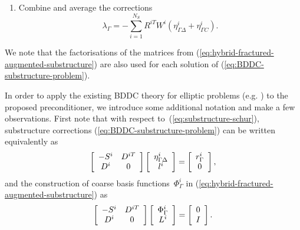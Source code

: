 \begin{algorithm}
\begin{enumerate}
\item Combine and average the corrections%
\begin{equation}
\lambda_{\Gamma}=-\sum_{i=1}^{N_{S}}R^{iT}W^{i}\left(  \eta_{\Gamma \Delta}^{i}%
+\eta_{\Gamma C}^{i}\right)  .\label{eq:BDDC-preconditioner}%
\end{equation}

\end{enumerate}
\end{algorithm}

We note that the factorisations of the matrices from
(\ref{eq:hybrid-fractured-augmented-substructure}) are also used for each
solution of (\ref{eq:BDDC-substructure-problem}).


In order to apply the existing BDDC theory for elliptic problems (e.g. \cite{Mandel-2007-BFM,Mandel-2005-ATP})
to the proposed preconditioner, 
we introduce some additional notation and make a few observations.
First note that with respect to~(\ref{eq:substructure-schur}), substructure corrections (\ref{eq:BDDC-substructure-problem})
can be written equivalently as
\begin{equation}
\left[
\begin{array}
[c]{cc}%
-S^{i} & D^{iT}\\
D^{i} & 0
\end{array}
\right]  \left[
\begin{array}
[c]{c}%
\eta_{\Gamma \Delta}^{i}\\
l^{i}%
\end{array}
\right]  =\left[
\begin{array}
[c]{c}%
r_{\Gamma}^{i}\\
0
\end{array}
\right],
\label{eq:BDDC-substructure-problem-with-Schur}%
\end{equation}
and the construction of coarse basis functions~$\Phi_{\Gamma}^{i}$ in
(\ref{eq:hybrid-fractured-augmented-substructure}) as
\begin{equation}
\left[
\begin{array}
[c]{cc}%
-S^{i} & D^{iT}\\
D^{i} & 0
\end{array}
\right]  \left[
\begin{array}
[c]{c}
\Phi_{\Gamma}^{i}\\
L^{i}%
\end{array}
\right]  =\left[
\begin{array}
[c]{c}%
0\\
I
\end{array}
\right]. 
\label{eq:bddc-substructure-problem-with-schur-for-coarse-basis}%
\end{equation}

